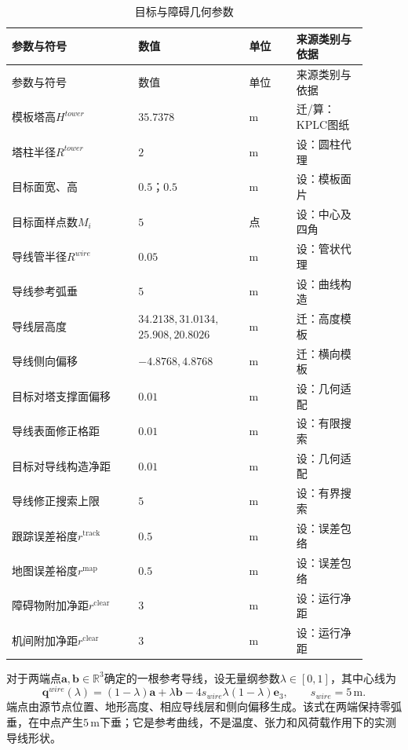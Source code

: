 \begin{longtable}{@{}p{0.32\linewidth}p{0.28\linewidth}p{0.12\linewidth}p{0.18\linewidth}@{}}
\caption{目标与障碍几何参数}\label{s0601:geometry_parameters}\\
\toprule
参数与符号 & 数值 & 单位 & 来源类别与依据\\
\midrule
\endfirsthead
\toprule
参数与符号 & 数值 & 单位 & 来源类别与依据\\
\midrule
\endhead
\bottomrule
\endfoot
模板塔高$H^{tower}$ & $35.7378$ & $\mathrm m$ & 迁/算：KPLC图纸\\
塔柱半径$R^{tower}$ & $2$ & $\mathrm m$ & 设：圆柱代理\\
目标面宽、高 & $0.5$；$0.5$ & $\mathrm m$ & 设：模板面片\\
目标面样点数$M_i$ & $5$ & 点 & 设：中心及四角\\
导线管半径$R^{wire}$ & $0.05$ & $\mathrm m$ & 设：管状代理\\
导线参考弧垂 & $5$ & $\mathrm m$ & 设：曲线构造\\
导线层高度 & $34.2138,31.0134,$ $25.908,20.8026$ & $\mathrm m$ & 迁：高度模板\\
导线侧向偏移 & $-4.8768,4.8768$ & $\mathrm m$ & 迁：横向模板\\
目标对塔支撑面偏移 & $0.01$ & $\mathrm m$ & 设：几何适配\\
导线表面修正格距 & $0.01$ & $\mathrm m$ & 设：有限搜索\\
目标对导线构造净距 & $0.01$ & $\mathrm m$ & 设：几何适配\\
导线修正搜索上限 & $5$ & $\mathrm m$ & 设：有界搜索\\
跟踪误差裕度$r^{\mathrm{track}}$ & $0.5$ & $\mathrm m$ & 设：误差包络\\
地图误差裕度$r^{\mathrm{map}}$ & $0.5$ & $\mathrm m$ & 设：误差包络\\
障碍物附加净距$r^{\mathrm{clear}}$ & $3$ & $\mathrm m$ & 设：运行净距\\
机间附加净距$r^{\mathrm{clear}}$ & $3$ & $\mathrm m$ & 设：运行净距\\
\end{longtable}

对于两端点$\mathbf a,\mathbf b\in\mathbb R^3$确定的一根参考导线，设无量纲参数$\lambda\in[0,1]$，其中心线为
\begin{equation}
 \mathbf q^{wire}(\lambda)
 =(1-\lambda)\mathbf a+\lambda\mathbf b
 -4s_{wire}\lambda(1-\lambda)\mathbf e_3,
 \qquad s_{wire}=5\,\mathrm m.
 \label{s0601:wire_numeric_geometry}
\end{equation}
端点由源节点位置、地形高度、相应导线层和侧向偏移生成。该式在两端保持零弧垂，在中点产生$5\,\mathrm m$下垂；它是参考曲线，不是温度、张力和风荷载作用下的实测导线形状。


